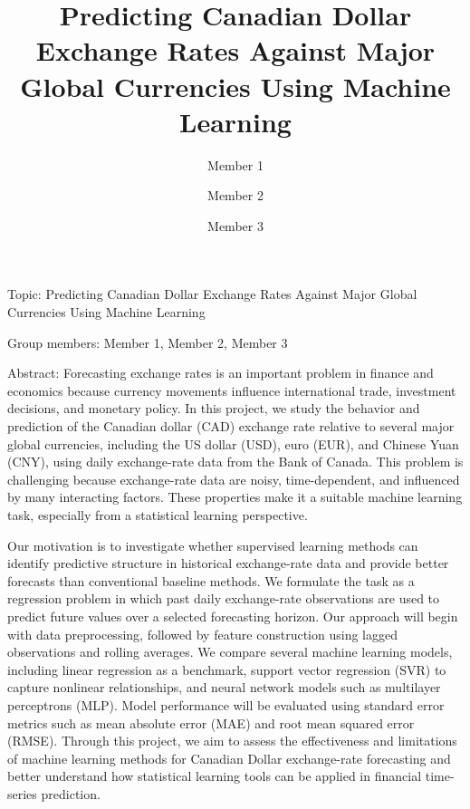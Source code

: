 \documentclass[12pt]{article}
\title{Predicting Canadian Dollar Exchange Rates Against Major Global Currencies Using Machine Learning}
\author{Member 1 \and Member 2 \and Member 3}
\date{}
\begin{document}
\maketitle

\noindent Topic: Predicting Canadian Dollar Exchange Rates Against Major Global Currencies Using Machine Learning

\vspace{0.5em}
\noindent Group members: Member 1, Member 2, Member 3

\vspace{0.5em}
\noindent Abstract: Forecasting exchange rates is an important problem in finance and economics because currency movements influence international trade, investment decisions, and monetary policy. In this project, we study the behavior and prediction of the Canadian dollar (CAD) exchange rate relative to several major global currencies, including the US dollar (USD), euro (EUR), and Chinese Yuan (CNY), using daily exchange-rate data from the Bank of Canada. This problem is challenging because exchange-rate data are noisy, time-dependent, and influenced by many interacting factors. These properties make it a suitable machine learning task, especially from a statistical learning perspective.

Our motivation is to investigate whether supervised learning methods can identify predictive structure in historical exchange-rate data and provide better forecasts than conventional baseline methods. We formulate the task as a regression problem in which past daily exchange-rate observations are used to predict future values over a selected forecasting horizon. Our approach will begin with data preprocessing, followed by feature construction using lagged observations and rolling averages. We compare several machine learning models, including linear regression as a benchmark, support vector regression (SVR) to capture nonlinear relationships, and neural network models such as multilayer perceptrons (MLP). Model performance will be evaluated using standard error metrics such as mean absolute error (MAE) and root mean squared error (RMSE). Through this project, we aim to assess the effectiveness and limitations of machine learning methods for Canadian Dollar exchange-rate forecasting and better understand how statistical learning tools can be applied in financial time-series prediction.
\end{document}
